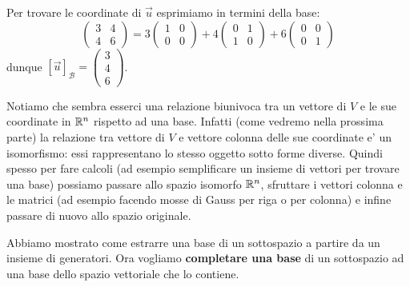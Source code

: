 \begin{solution}
    Per trovare le coordinate di $\vec{u}$ esprimiamo in termini della base:
    \begin{equation*}
        \begin{pmatrix}
            3 & 4 \\ 4 & 6
        \end{pmatrix} = 3\begin{pmatrix} 1&0\\0&0 \end{pmatrix} + 4\begin{pmatrix} 0&1\\1&0 \end{pmatrix} + 6\begin{pmatrix} 0&0\\0&1 \end{pmatrix}
    \end{equation*}
    dunque $[\vec{u}]_{\mathcal{B}} = \begin{pmatrix}
        3 \\ 4 \\ 6
    \end{pmatrix}$.
\end{solution}

Notiamo che sembra esserci una relazione biunivoca tra un vettore di $V$ e le sue coordinate in $\mathbb{R}^n$ rispetto ad una base. Infatti (come vedremo nella prossima parte) la relazione tra vettore di $V$ e vettore colonna delle sue coordinate e' un isomorfismo: essi rappresentano lo stesso oggetto sotto forme diverse. Quindi spesso per fare calcoli (ad esempio semplificare un insieme di vettori per trovare una base) possiamo passare allo spazio isomorfo $\mathbb{R}^n$, sfruttare i vettori colonna e le matrici (ad esempio facendo mosse di Gauss per riga o per colonna) e infine passare di nuovo allo spazio originale.

Abbiamo mostrato come estrarre una base di un sottospazio a partire da un insieme di generatori. Ora vogliamo \textbf{completare una base} di un sottospazio ad una base dello spazio vettoriale che lo contiene.

